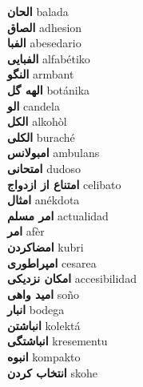 \textbf{ الحان  } balada \\
\textbf{ الصاق  } adhesion \\
\textbf{ الفبا  } abesedario \\
\textbf{ الفبایی  } alfabétiko \\
\textbf{ النگو  } armbant \\
\textbf{ الهه گل  } botánika \\
\textbf{ الو  } candela \\
\textbf{ الکل  } alkohòl \\
\textbf{ الکلی  } buraché \\
\textbf{ امبولانس  } ambulans \\
\textbf{ امتحانی  } dudoso \\
\textbf{ امتناع از ازدواج  } celibato \\
\textbf{ امثال  } anékdota \\
\textbf{ امر مسلم  } actualidad \\
\textbf{ امر  } afèr \\
\textbf{ امضاکردن  } kubri \\
\textbf{ امپراطوری  } cesarea \\
\textbf{ امکان نزدیکی  } accesibilidad \\
\textbf{ امید واهی  } soño \\
\textbf{ انبار  } bodega \\
\textbf{ انباشتن  } kolektá \\
\textbf{ انباشتگی  } kresementu \\
\textbf{ انبوه  } kompakto \\
\textbf{ انتخاب کردن  } skohe \\
